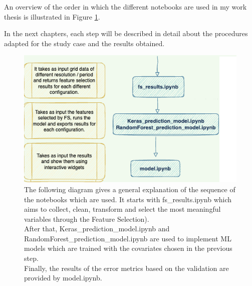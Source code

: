 An overview of the order in which the different notebooks are used in my work thesis is illustrated in Figure \ref{fig:notebooks}.\par
In the next chapters, each step will be described in detail about the procedures adapted for the study case and the results obtained.
\begin{figure}[H]
    \centering
    \includegraphics[scale=0.40]{images/overview _notebooks.png}
    \caption{The following diagram gives a general explanation of the sequence of the notebooks which are used. It starts with fs\_results.ipynb which aims to collect, clean, transform and select the most meaningful variables through the Feature Selection). \\
    After that, Keras\_prediction\_model.ipynb and RandomForest\_prediction\_model.ipynb are used to implement ML models which are trained with the covariates chosen in the previous step. \\
    Finally, the results of the error metrics based on the validation are provided by model.ipynb. }
    \label{fig:notebooks}
\end{figure}